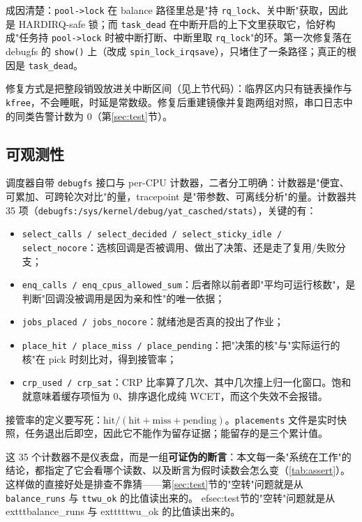 成因清楚：\texttt{pool->lock} 在 balance 路径里总是"持 \texttt{rq\_lock}、关中断"获取，因此是 HARDIRQ-safe 锁；而 \texttt{task\_dead} 在中断开启的上下文里获取它，恰好构成"任务持 \texttt{pool->lock} 时被中断打断、中断里取 \texttt{rq\_lock}"的环。第一次修复落在 debugfs 的 \texttt{show()} 上（改成 \texttt{spin\_lock\_irqsave}），只堵住了一条路径；真正的根因是 \texttt{task\_dead}。

修复方式是把整段销毁放进关中断区间（见上节代码）：临界区内只有链表操作与 \texttt{kfree}，不会睡眠，时延是常数级。修复后重建镜像并复跑两组对照，串口日志中的同类告警计数为 0（第\ref{sec:test}节）。

\subsection{可观测性}

调度器自带 \texttt{debugfs} 接口与 per-CPU 计数器，二者分工明确：计数器是"便宜、可累加、可跨轮次对比"的量，tracepoint 是"带参数、可离线分析"的量。计数器共 35 项（\texttt{debugfs:/sys/kernel/debug/yat\_casched/stats}），关键的有：

\begin{itemize}
  \item \texttt{select\_calls / select\_decided / select\_sticky\_idle / select\_nocore}：选核回调是否被调用、做出了决策、还是走了复用/失败分支；
  \item \texttt{enq\_calls / enq\_cpus\_allowed\_sum}：后者除以前者即"平均可运行核数"，是判断"回调没被调用是因为亲和性"的唯一依据；
  \item \texttt{jobs\_placed / jobs\_nocore}：就绪池是否真的投出了作业；
  \item \texttt{place\_hit / place\_miss / place\_pending}：把"决策的核"与"实际运行的核"在 pick 时刻比对，得到接管率；
  \item \texttt{crp\_used / crp\_sat}：CRP 比率算了几次、其中几次撞上归一化窗口。饱和就意味着缓存项恒为 0、排序退化成纯 WCET，而这个失效不会报错。
\end{itemize}

接管率的定义要写死：$\text{hit}/(\text{hit}+\text{miss}+\text{pending})$。\texttt{placements} 文件是实时快照，任务退出后即空，因此它不能作为留存证据；能留存的是三个累计值。

这 35 个计数器不是仪表盘，而是一组\textbf{可证伪的断言}：本文每一条"系统在工作"的结论，都指定了它会看哪个读数、以及断言为假时读数会怎么变（\autoref{tab:assert}）。这样做的直接好处是排查不靠猜——第\ref{sec:test}节的"空转"问题就是从 \texttt{balance\_runs} 与 \texttt{ttwu\_ok} 的比值读出来的。
ef{sec:test}节的"空转"问题就是从 	exttt{balance\_runs} 与 	exttt{ttwu\_ok} 的比值读出来的。

